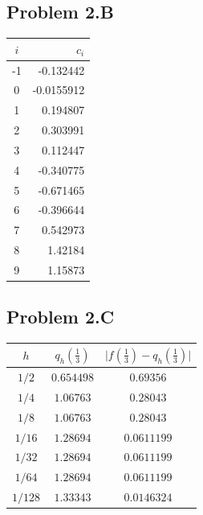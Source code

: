 \documentclass[a4paper,12pt,onecolumn,final]{article}
\begin{document}
\subsection*{Problem 2.B}
\begin{center}
\begin{tabular}{cr}
\hline\hline
 $i$ & $c_i$
\\
\hline
-1 & -0.132442
\\
0 & -0.0155912
\\
1 & 0.194807
\\
2 & 0.303991
\\
3 & 0.112447
\\
4 & -0.340775
\\
5 & -0.671465
\\
6 & -0.396644
\\
7 & 0.542973
\\
8 & 1.42184
\\
9 & 1.15873
\\
\hline\hline
\end{tabular}
\end{center}
\subsection*{Problem 2.C}
\begin{center}
\begin{tabular}{c|cc}
 $h$ & $q_h(\frac{1}{3})$ & $\big|f(\frac{1}{3}) - q_h(\frac{1}{3})\big|$
\\[0.5ex]
\hline
$1/2$ & $0.654498$	& $0.69356$ 
\\
$1/4$ & $1.06763$	& $0.28043$
\\
$1/8$ & $1.06763$	& $0.28043$
\\
$1/16$ & $1.28694$	& $0.0611199$
\\
$1/32$ &  $1.28694$	& $0.0611199$
\\
$1/64$ & $1.28694$	& $0.0611199$
\\
$1/128$ & $1.33343$	& $0.0146324$

\\
\end{tabular}
\end{center}
\end{document}
